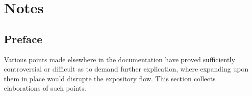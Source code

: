 \chapter{Notes}

%
%

\section{Preface}

Various points made elsewhere in the documentation have proved 
sufficiently controversial or difficult as to demand further explication, 
where expanding upon them in place would disrupte the expository flow. 
This section collects elaborations of such points. 



